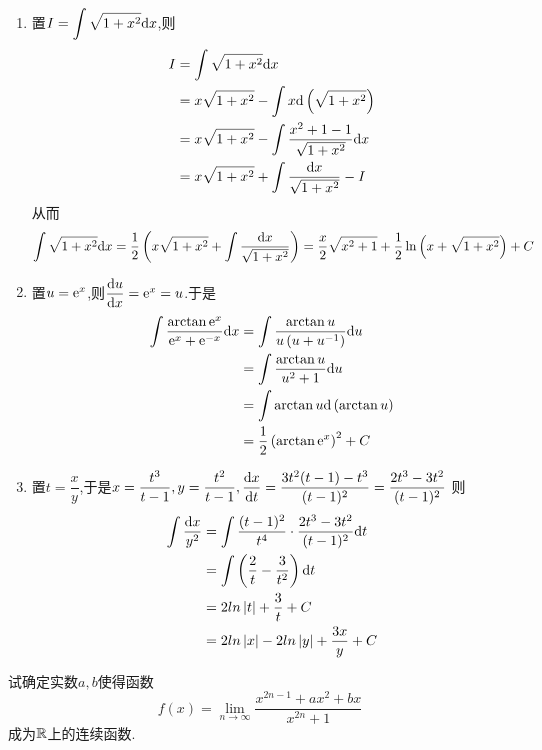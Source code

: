 \documentclass{ctexart}
\begin{document}
\begin{solution}[Solution]
    \begin{enumerate}[leftmargin=*,label=\textbf{(\arabic*)}]
        \item 置$\displaystyle I=\int\sqrt{1+x^2}\mathrm{d} x$,则
            $$\begin{aligned}
                I
                &= \int\sqrt{1+x^2}\mathrm{d} x \\
                &= x\sqrt{1+x^2}-\int x\mathrm{d}\left(\sqrt{1+x^2}\right) \\
                &= x\sqrt{1+x^2}-\int\dfrac{x^2+1-1}{\sqrt{1+x^2}}\mathrm{d} x \\
                &= x\sqrt{1+x^2}+\int\dfrac{\mathrm{d} x}{\sqrt{1+x^2}}-I
            \end{aligned}$$
            从而
            $$\int\sqrt{1+x^2}\mathrm{d} x=\dfrac{1}{2}\left(x\sqrt{1+x^2}+\int\dfrac{\mathrm{d} x}{\sqrt{1+x^2}}\right)=\dfrac{x}{2}\sqrt{x^2+1}+\dfrac{1}{2}\ln\left(x+\sqrt{1+x^2}\right)+C$$
        \item 置$u=\mathrm{e}^x$,则$\dfrac{\mathrm{d} u}{\mathrm{d} x}=\mathrm{e}^x=u$.于是
            $$\begin{aligned}
                \int\dfrac{\arctan \mathrm{e}^x}{\mathrm{e}^x+\mathrm{e}^{-x}}\mathrm{d} x
                &= \int\dfrac{\arctan u}{u\left(u+u^{-1}\right)}\mathrm{d} u \\
                &= \int\dfrac{\arctan u}{u^2+1}\mathrm{d} u \\
                &= \int{\arctan u\mathrm{d}\left(\arctan u\right)} \\
                &= \dfrac{1}{2}\left(\arctan\mathrm{e}^x\right)^2+C
            \end{aligned}$$
        \item 置$t=\dfrac{x}{y}$,于是$x=\dfrac{t^3}{t-1},y=\dfrac{t^2}{t-1},\dfrac{\mathrm{d} x}{\mathrm{d} t}=\dfrac{3t^2(t-1)-t^3}{(t-1)^2}=\dfrac{2t^3-3t^2}{(t-1)^2}$
            则$$\begin{aligned}
                \int\dfrac{\mathrm{d} x}{y^2}
                &= \int{\dfrac{(t-1)^2}{t^4}\cdot\dfrac{2t^3-3t^2}{(t-1)^2}\mathrm{d}t} \\
                &= \int{\left(\dfrac{2}{t}-\dfrac{3}{t^2}\right)\mathrm{d}t} \\
                &= 2ln\left|t\right|+\dfrac{3}{t}+C \\
                &= 2ln\left|x\right|-2ln\left|y\right|+\dfrac{3x}{y}+C
            \end{aligned}$$
    \end{enumerate}
\end{solution}
\begin{problem}[4.(10\songti{分})]
    试确定实数$a,b$使得函数$$f(x)=\lim_{n\to\infty}{\dfrac{x^{2n-1}+ax^2+bx}{x^{2n}+1}}$$成为$\mathbb{R}$上的连续函数.
\end{problem}
\end{document}
